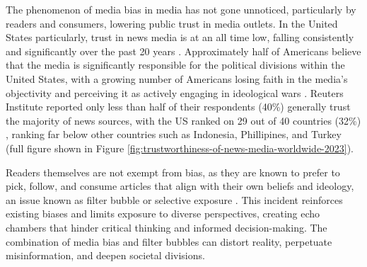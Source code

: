 The phenomenon of media bias in media has not gone unnoticed, particularly by readers and consumers, lowering public trust in media outlets. In the United States particularly, trust in news media is at an all time low, falling consistently and significantly over the past 20 years \cite{pew-2021-partisan-divides, gallup-knight-2020-american-views, reuters-2023-digital-news-report}. Approximately half of Americans believe that the media is significantly responsible for the political divisions within the United States, with a growing number of Americans losing faith in the media's objectivity and perceiving it as actively engaging in ideological wars \cite{gallup-knight-2020-american-views}. Reuters Institute reported only less than half of their respondents (40\%) generally trust the majority of news sources, with the US ranked on 29 out of 40 countries (32\%) \cite{reuters-2023-digital-news-report,reuters-2023-trust}, ranking far below other countries such as Indonesia, Phillipines, and Turkey (full figure shown in Figure \ref{fig:trustworthiness-of-news-media-worldwide-2023}).

Readers themselves are not exempt from bias, as they are known to prefer to pick, follow, and consume articles that align with their own beliefs and ideology, an issue known as filter bubble \cite{lim-2018-understanding} or selective exposure \cite{spinde-2024-taxonomy}. This incident reinforces existing biases and limits exposure to diverse perspectives, creating echo chambers that hinder critical thinking and informed decision-making. The combination of media bias and filter bubbles can distort reality, perpetuate misinformation, and deepen societal divisions.


